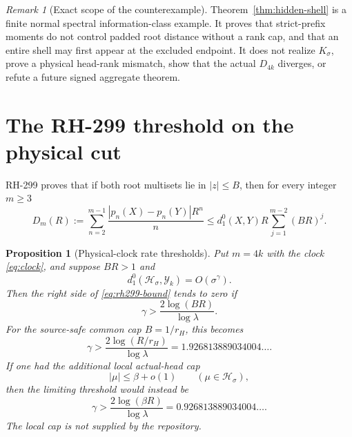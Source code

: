 \documentclass[11pt]{article}
\newtheorem{proposition}[theorem]{Proposition}
\theoremstyle{remark}
\newtheorem{remark}[theorem]{Remark}
\newcommand{\cH}{\mathcal H}
\newcommand{\cY}{\mathcal Y}
\begin{document}
\begin{remark}[Exact scope of the counterexample]
Theorem~\ref{thm:hidden-shell} is a finite normal spectral
information-class example.  It proves that strict-prefix moments do not
control padded root distance without a rank cap, and that an entire shell may
first appear at the excluded endpoint.  It does not realize $K_\sigma$, prove
a physical head-rank mismatch, show that the actual $D_{4k}$ diverges, or
refute a future signed aggregate theorem.
\end{remark}

\section{The RH-299 threshold on the physical cut}

RH-299 proves that if both root multisets lie in $|z|\le B$, then for every
integer $m\ge3$ \citep{WangRootTransport2026}
\begin{equation}\label{eq:rh299-bound}
 D_m(R):=\sum_{n=2}^{m-1}
 \frac{|p_n(X)-p_n(Y)|R^n}{n}
 \le d_1^0(X,Y)R\sum_{j=1}^{m-2}(BR)^j.
\end{equation}

\begin{proposition}[Physical-clock rate thresholds]
\label{prop:thresholds}
Put $m=4k$ with the clock \eqref{eq:clock}, and suppose $BR>1$ and
\begin{equation}\label{eq:matching-rate}
 d_1^0(\cH_\sigma,\cY_k)=O(\sigma^\gamma).
\end{equation}
Then the right side of \eqref{eq:rh299-bound} tends to zero if
\begin{equation}\label{eq:general-threshold}
 \gamma>\frac{2\log(BR)}{\log\lambda}.
\end{equation}
For the source-safe common cap $B=1/r_H$, this becomes
\begin{equation}\label{eq:global-threshold}
 \gamma>\frac{2\log(R/r_H)}{\log\lambda}
 =1.926813889034004\ldots.
\end{equation}
If one had the additional local actual-head cap
\begin{equation}\label{eq:local-cap}
 |\mu|\le\beta+o(1)\qquad(\mu\in\cH_\sigma),
\end{equation}
then the limiting threshold would instead be
\begin{equation}\label{eq:local-threshold}
 \gamma>\frac{2\log(\beta R)}{\log\lambda}
 =0.926813889034004\ldots.
\end{equation}
The local cap is not supplied by the repository.
\end{proposition}
\end{document}
